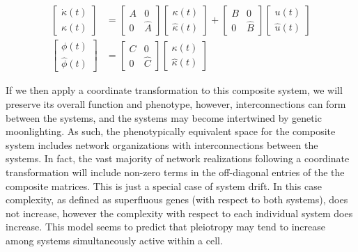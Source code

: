 \documentclass{article}
\newcommand{\1}{\mathbbm{1}}
\begin{document}
\begin{equation}
  \begin{aligned}
    \begin{bmatrix}
      \dot{\kappa}(t) \\
      \hat{\kappa}(t) 
    \end{bmatrix} &=
    \begin{bmatrix}
      A & 0 \\
      0 & \widehat{A} 
    \end{bmatrix}
    \begin{bmatrix}
      \kappa(t) \\
      \hat{\kappa}(t)
    \end{bmatrix} + 
    \begin{bmatrix}
      B & 0 \\
      0 & \widehat{B}
    \end{bmatrix}
    \begin{bmatrix}
      u(t) \\ \hat{u}(t)
    \end{bmatrix} \\
    \begin{bmatrix}
      \phi(t) \\
      \hat{\phi}(t)
    \end{bmatrix} &=
    \begin{bmatrix}
      C & 0 \\
      0 & \widehat{C} 
    \end{bmatrix}
     \begin{bmatrix}
       \kappa(t) \\
       \hat{\kappa}(t)
    \end{bmatrix}
  \end{aligned}
\end{equation}

If we then apply a coordinate transformation to this composite system, we will preserve its overall
function and phenotype, however, interconnections can form between the systems, and the systems may
become intertwined by genetic moonlighting. As such, the phenotypically equivalent space for the composite system
includes network organizations with interconnections between the systems. In fact, the vast majority of network
realizations following a coordinate transformation will include non-zero terms in the off-diagonal entries of the the composite matrices. 
This is just a special case of system drift. In this case complexity, as defined as superfluous genes (with respect to both systems), does
not increase, however the complexity with respect to each individual system does increase. This model seems to predict that pleiotropy
may tend to increase among systems simultaneously active within a cell.
\end{document}
